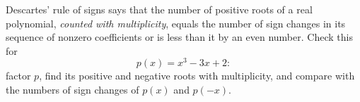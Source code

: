Descartes' rule of signs says that the number of positive roots of a real polynomial, \emph{counted with multiplicity}, equals the number of sign changes in its sequence of nonzero coefficients or is less than it by an even number. Check this for
\[
p(x)=x^3-3x+2 :
\]
factor $p$, find its positive and negative roots with multiplicity, and compare with the numbers of sign changes of $p(x)$ and $p(-x)$.
